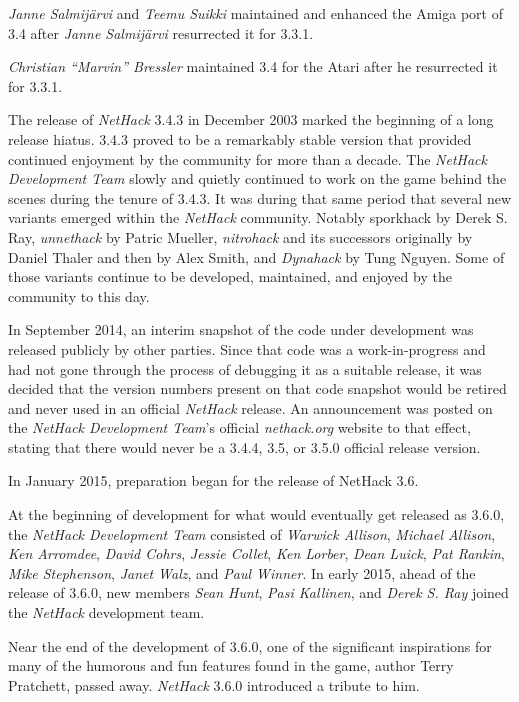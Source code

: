 \documentclass[titlepage]{article}
\begin{document}
\medskip
\noindent \textit{Janne Salmij\"{a}rvi} and \textit{Teemu Suikki} maintained
and enhanced the Amiga port of 3.4 after \textit{Janne Salmij\"{a}rvi} resurrected
it for 3.3.1.

\medskip
\noindent \textit{Christian ``Marvin'' Bressler} maintained 3.4 for the Atari after he
resurrected it for 3.3.1.

\medskip
The release of \textit{NetHack} 3.4.3 in December 2003 marked the beginning of
a long release hiatus. 3.4.3 proved to be a remarkably stable version that
provided continued enjoyment by the community for more than a decade. The
\textit{NetHack Development Team} slowly and quietly continued to work on the game behind the scenes
during the tenure of 3.4.3. It was during that same period that several new
variants emerged within the \textit{NetHack} community. Notably sporkhack by
Derek S. Ray, \textit{unnethack} by Patric Mueller, \textit{nitrohack} and its
successors originally by Daniel Thaler and then by Alex Smith, and
\textit{Dynahack} by Tung Nguyen.
Some of those variants continue to be
developed, maintained, and enjoyed by the community to this day.

\medskip
In September 2014, an interim snapshot of the code under development was
released publicly by other parties.
Since that code was a work-in-progress
and had not gone through the process of debugging it as a suitable release,
it was decided that the version numbers present on that code snapshot would
be retired and never used in an official \textit{NetHack} release.
An announcement was posted on the \textit{NetHack Development Team}'s official
\textit{nethack.org} website
to that effect, stating that there would never be a 3.4.4, 3.5, or 3.5.0
official release version.

\medskip
In January 2015, preparation began for the release of NetHack 3.6.

\medskip
At the beginning of development for what would eventually get released as
3.6.0, the \textit{NetHack Development Team} consisted of \textit{Warwick Allison},
\textit{Michael Allison}, \textit{Ken Arromdee},
\textit{David Cohrs}, \textit{Jessie Collet},
\textit{Ken Lorber}, \textit{Dean Luick}, \textit{Pat Rankin},
\textit{Mike Stephenson}, \textit{Janet Walz}, and \textit{Paul Winner}.
In early 2015, ahead of the release of 3.6.0, new members
\textit{Sean Hunt}, \textit{Pasi Kallinen}, and \textit{Derek S. Ray}
joined the \textit{NetHack} development team.

\medskip
Near the end of the development of 3.6.0, one of the significant inspirations
for many of the humorous and fun features found in the game,
author Terry Pratchett, passed away. \textit{NetHack} 3.6.0 introduced
a tribute to him.
\end{document}
